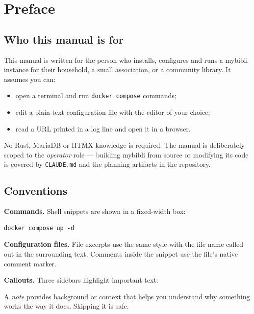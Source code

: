 \chapter*{Preface}

\section*{Who this manual is for}

This manual is written for the person who installs, configures and
runs a mybibli instance for their household, a small association,
or a community library. It assumes you can:

\begin{itemize}
  \item open a terminal and run \texttt{docker compose} commands;
  \item edit a plain-text configuration file with the editor of
        your choice;
  \item read a URL printed in a log line and open it in a browser.
\end{itemize}

No Rust, MariaDB or HTMX knowledge is required. The manual is
deliberately scoped to the \emph{operator} role — building mybibli
from source or modifying its code is covered by
\texttt{CLAUDE.md} and the planning artifacts in the repository.

\section*{Conventions}

\textbf{Commands.} Shell snippets are shown in a fixed-width box:

\begin{lstlisting}
docker compose up -d
\end{lstlisting}

\textbf{Configuration files.} File excerpts use the same style with
the file name called out in the surrounding text. Comments inside
the snippet use the file's native comment marker.

\textbf{Callouts.} Three sidebars highlight important text:

\begin{note}
A \emph{note} provides background or context that helps you understand
why something works the way it does. Skipping it is safe.
\end{note}

